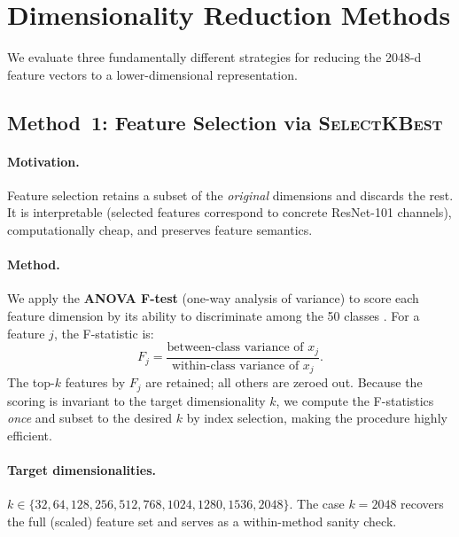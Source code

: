 \documentclass[10pt,letterpaper]{article}
\begin{document}
\section{Dimensionality Reduction Methods}
\label{sec:methods}

We evaluate three fundamentally different strategies for reducing the
2048-d feature vectors to a lower-dimensional representation.

\subsection{Method~1: Feature Selection via \textsc{SelectKBest}}
\label{sec:sel}

\paragraph{Motivation.}
Feature selection retains a subset of the \emph{original} dimensions and
discards the rest.
It is interpretable (selected features correspond to concrete ResNet-101
channels), computationally cheap, and preserves feature semantics.

\paragraph{Method.}
We apply the \textbf{ANOVA F-test} (one-way analysis of variance) to score
each feature dimension by its ability to discriminate among the 50 classes
\cite{fisher1992statistical,guyon2003introduction}.
For a feature $j$, the F-statistic is:
\begin{equation}
    F_j = \frac{\text{between-class variance of } x_j}
               {\text{within-class variance of } x_j}.
    \label{eq:ftest}
\end{equation}
The top-$k$ features by $F_j$ are retained; all others are zeroed out.
Because the scoring is invariant to the target dimensionality $k$, we
compute the F-statistics \emph{once} and subset to the desired $k$ by
index selection, making the procedure highly efficient.

\paragraph{Target dimensionalities.}
$k \in \{32, 64, 128, 256, 512, 768, 1024, 1280, 1536, 2048\}$.
The case $k=2048$ recovers the full (scaled) feature set and serves as a
within-method sanity check.
\end{document}
